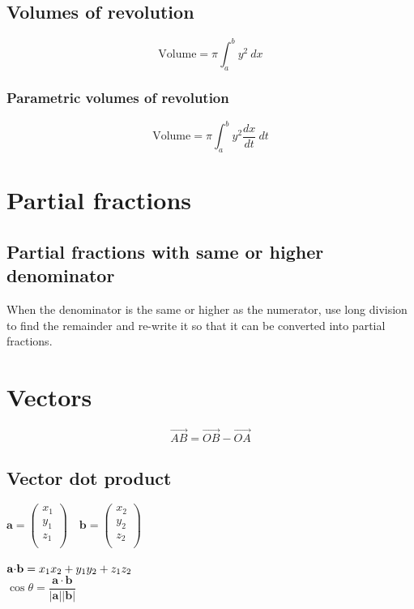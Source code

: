 \documentclass{article}[18pt]
\begin{document}
\subsection{Volumes of revolution}
$$\textrm{Volume}=\pi\int_a^b y^2 \ dx$$
\subsubsection{Parametric volumes of revolution}
$$\textrm{Volume}=\pi\int_a^b y^2\frac{dx}{dt} \ dt$$
\section{Partial fractions}
\subsection{Partial fractions with same or higher denominator}
When the denominator is the same or higher as the numerator, use long division to find the remainder and re-write it so that it can be converted into partial fractions.
\section{Vectors}
$$\overrightarrow{AB}=\overrightarrow{OB}-\overrightarrow{OA}$$
\subsection{Vector dot product}
$\mathbf{a}=\begin{pmatrix}
x_1\\
y_1\\
z_1\\
\end{pmatrix}
\quad
\mathbf{b}=\begin{pmatrix}
x_2\\
y_2\\
z_2\\
\end{pmatrix}
$
\\
\\
$\mathbf{a}\mathlarger{\cdot}\mathbf{b}=x_1x_2+y_1y_2+z_1z_2$\\
$\cos\theta=\dfrac{\mathbf{a}\cdot \mathbf{b}}{|\mathbf{a}||\mathbf{b}|}$\\
\end{document}
